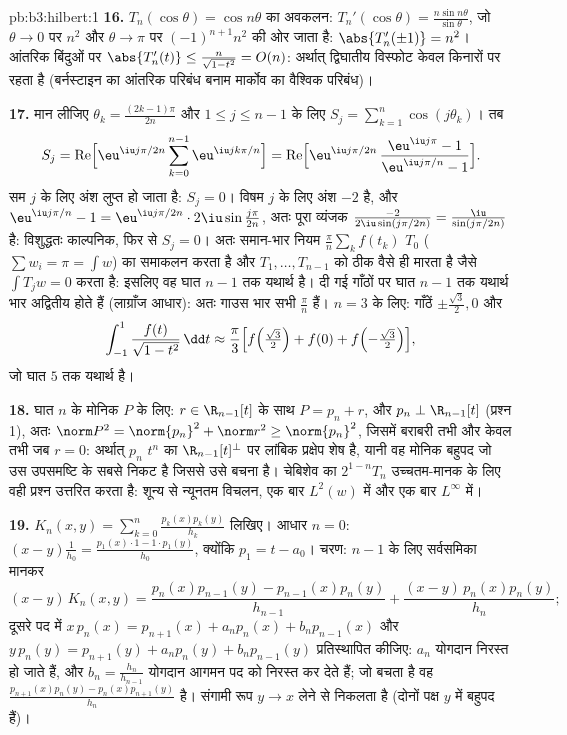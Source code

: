 \begin{solution}{pb:b3:hilbert:1}
\textbf{16.} $T_n(\cos\theta) = \cos
n\theta$ का अवकलन: $T_n'(\cos\theta) = \frac{n\sin n\theta}
{\sin\theta}$, जो $\theta \to 0$ पर $n^2$ और $\theta \to \pi$ पर
$(-1)^{n+1}n^2$ की ओर जाता है: $\abs{T_n'(\pm1)} =
n^2$। आंतरिक बिंदुओं पर $\abs{T_n'(t)} \leq
\frac{n}{\sqrt{1 - t^2}} = O(n)$: अर्थात् द्विघातीय
विस्फोट केवल किनारों पर रहता है (बर्नस्टाइन का आंतरिक परिबंध बनाम
मार्कोव का वैश्विक परिबंध)।

\textbf{17.} मान लीजिए $\theta_k = \frac{(2k-1)\pi}{2n}$ और $1 \leq j \leq n-1$ के लिए $S_j
= \sum_{k=1}^n\cos(j\theta_k)$। तब
\[
S_j = \operatorname{Re}\Bigl[\eu^{\iu j\pi/2n}
\sum_{k=0}^{n-1}\eu^{\iu jk\pi/n}\Bigr]
= \operatorname{Re}\Bigl[\eu^{\iu j\pi/2n}\,
\frac{\eu^{\iu j\pi} - 1}{\eu^{\iu j\pi/n} - 1}\Bigr] .
\]
सम $j$ के लिए अंश लुप्त हो जाता है: $S_j = 0$। विषम $j$ के लिए अंश
$-2$ है, और $\eu^{\iu j\pi/n} - 1 =
\eu^{\iu j\pi/2n}\cdot2\iu\sin\frac{j\pi}{2n}$, अतः पूरा व्यंजक $\frac{-2}{2\iu\sin(j\pi/2n)} =
\frac{\iu}{\sin(j\pi/2n)}$ है: विशुद्धतः काल्पनिक,
फिर से $S_j = 0$। अतः समान-भार नियम $\frac\pi n\sum_kf(t_k)$ $T_0$ ($\sum w_i = \pi = \int w$) का समाकलन करता
है और $T_1,
\dots, T_{n-1}$ को ठीक वैसे ही मारता है जैसे $\int T_jw = 0$ करता है: इसलिए वह
घात $n - 1$ तक यथार्थ है। दी गई गाँठों पर घात $n-1$ तक यथार्थ भार
अद्वितीय होते हैं (लाग्राँज आधार): अतः गाउस भार सभी $\frac\pi n$ हैं। $n = 3$
के लिए: गाँठें $\pm\frac{\sqrt3}2, 0$ और
\[
\int_{-1}^1\frac{f(t)}{\sqrt{1 - t^2}}\,\dd t \approx
\frac\pi3\Bigl[f\Bigl(\tfrac{\sqrt3}2\Bigr) + f(0) +
f\Bigl(-\tfrac{\sqrt3}2\Bigr)\Bigr],
\]
जो घात $5$ तक यथार्थ है।

\textbf{18.} घात $n$ के मोनिक $P$ के लिए: $r \in \R_{n-1}[t]$ के साथ $P = p_n + r$,
और $p_n \perp \R_{n-1}[t]$ (प्रश्न 1), अतः $\norm P^2 = \norm{p_n}^2 + \norm r^2 \geq
\norm{p_n}^2$, जिसमें बराबरी तभी और केवल तभी जब
$r = 0$: अर्थात् $p_n$ $t^n$ का $\R_{n-1}[t]^\perp$ पर लांबिक प्रक्षेप शेष है, यानी
वह मोनिक बहुपद जो उस उपसमष्टि के सबसे निकट है जिससे उसे बचना है।
चेबिशेव का $2^{1-n}T_n$ उच्चतम-मानक के लिए वही प्रश्न उत्तरित करता है: शून्य
से न्यूनतम विचलन, एक बार $L^2(w)$ में और एक बार $L^\infty$ में।

\textbf{19.} $K_n(x, y) =
\sum_{k=0}^n\frac{p_k(x)p_k(y)}{h_k}$ लिखिए। आधार $n = 0$: $(x -
y)\frac1{h_0} = \frac{p_1(x)\cdot1 - 1\cdot p_1(y)}{h_0}$, क्योंकि $p_1 = t - a_0$। चरण:
$n -
1$ के लिए सर्वसमिका मानकर
\[
(x - y)\,K_n(x,y) = \frac{p_n(x)p_{n-1}(y) -
p_{n-1}(x)p_n(y)}{h_{n-1}} +
\frac{(x - y)\,p_n(x)p_n(y)}{h_n} ;
\]
दूसरे पद में $x\,p_n(x) = p_{n+1}(x) + a_np_n(x) +
b_np_{n-1}(x)$ और $y\,p_n(y) = p_{n+1}(y) + a_np_n(y) +
b_np_{n-1}(y)$ प्रतिस्थापित कीजिए: $a_n$ योगदान निरस्त
हो जाते हैं, और $b_n = \frac{h_n}{h_{n-1}}$ योगदान आगमन पद को निरस्त कर देते हैं; जो बचता
है वह $\frac{p_{n+1}(x)p_n(y) - p_n(x)p_{n+1}(y)}{h_n}$ है। संगामी रूप $y \to x$ लेने से निकलता है (दोनों पक्ष $y$
में बहुपद हैं)।


\end{solution}
